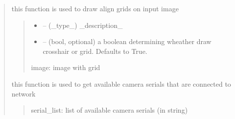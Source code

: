 \documentclass[letterpaper,10pt,english]{sphinxmanual}
\begin{document}
\begin{quote}

\begin{savenotes}\begin{fulllineitems}
\label{\detokenize{setting/backend/camera_funcs:oxin.backend.camera_funcs.draw_grid}}
\pysigstartsignatures
{}
\pysigstopsignatures
\sphinxAtStartPar
this function is used to draw align grids on input image
\begin{quote}\begin{description}
\begin{itemize}
\item {} 
\sphinxAtStartPar
{} – (\_type\_) \_description\_

\item {} 
\sphinxAtStartPar
{} – (bool, optional) a boolean determining wheather draw cross\sphinxhyphen{}hair or grid. Defaults to True.

\end{itemize}

\sphinxAtStartPar
image: image with grid

\end{description}\end{quote}

\end{fulllineitems}\end{savenotes}


\begin{savenotes}\begin{fulllineitems}
\label{\detokenize{setting/backend/camera_funcs:oxin.backend.camera_funcs.get_available_cameras_list_serial_numbers}}
\pysigstartsignatures
{}
\pysigstopsignatures
\sphinxAtStartPar
this function is used to get available camera serials that are connected to network
\begin{quote}\begin{description}
\sphinxAtStartPar
serial\_list: list of available camera serials (in string)


\end{description}
\end{quote}
\end{fulllineitems}
\end{savenotes}
\end{quote}
\end{document}

